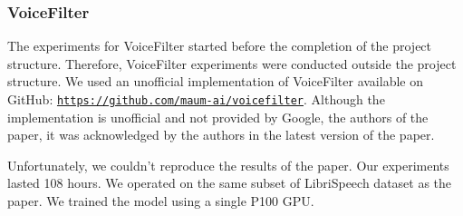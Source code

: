 \subsubsection{VoiceFilter}
The experiments for VoiceFilter \cite{wang2019voicefilter} started before the completion of the project structure. Therefore, VoiceFilter experiments were conducted outside the project structure. We used an unofficial implementation of VoiceFilter available on GitHub: \texttt{\url{https://github.com/maum-ai/voicefilter}}. Although the implementation is unofficial and not provided by Google, the authors of the paper, it was acknowledged by the authors in the latest version of the paper.

Unfortunately, we couldn't reproduce the results of the paper. Our experiments lasted 108 hours. We operated on the same subset of LibriSpeech dataset \cite{librispeech} as the paper. We trained the model using a single P100 GPU.